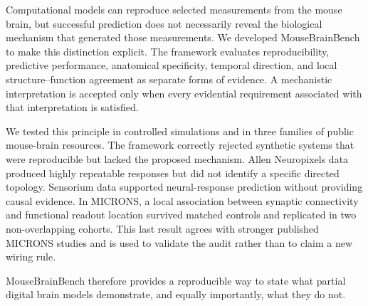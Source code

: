 Computational models can reproduce selected measurements from the mouse brain,
but successful prediction does not necessarily reveal the biological mechanism
that generated those measurements. We developed MouseBrainBench to make this
distinction explicit. The framework evaluates reproducibility, predictive
performance, anatomical specificity, temporal direction, and local
structure--function agreement as separate forms of evidence. A mechanistic
interpretation is accepted only when every evidential requirement associated
with that interpretation is satisfied.

We tested this principle in controlled simulations and in three families of
public mouse-brain resources. The framework correctly rejected synthetic
systems that were reproducible but lacked the proposed mechanism. Allen
Neuropixels data produced highly repeatable responses but did not identify a
specific directed topology. Sensorium data supported neural-response prediction
without providing causal evidence. In MICRONS, a local association between
synaptic connectivity and functional readout location survived matched controls
and replicated in two non-overlapping cohorts. This last result agrees with
stronger published MICRONS studies and is used to validate the audit rather than
to claim a new wiring rule.

MouseBrainBench therefore provides a reproducible way to state what partial
digital brain models demonstrate, and equally importantly, what they do not.
